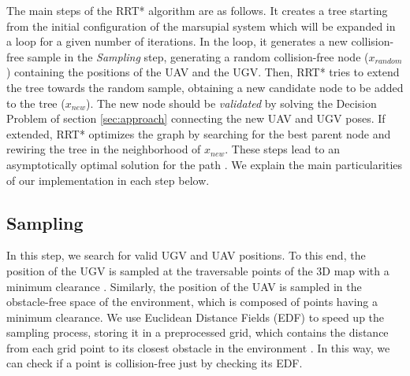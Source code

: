 The main steps of the RRT* algorithm are as follows. %
It creates a tree starting from the initial configuration of the marsupial system which will be expanded in a loop for a given number of iterations. In the loop, it generates a new collision-free sample in the \textit{Sampling} step, generating a random collision-free node ($x_{random}$) containing the positions of the UAV and the UGV. Then, RRT* tries to extend the tree towards the random sample, obtaining a new candidate node to be added to the tree ($x_{new}$). The new node should be \textit{validated} by solving the Decision Problem  of section \ref{sec:approach} connecting the new UAV and UGV poses. If extended, RRT* optimizes the graph by searching for the best parent node and rewiring the tree in the neighborhood of $x_{new}$. These steps lead to an asymptotically optimal solution for the path \cite{karaman_rrt_star}. We explain the main particularities of our implementation in each step below.

\subsection{Sampling}

In this step, we search for valid UGV and UAV positions. To this end, the position of the UGV is sampled at the traversable points of the 3D map with a minimum clearance \cite{driving_pc}. Similarly, the position of the UAV is sampled in the obstacle-free space of the environment, which is composed of points having a minimum clearance. We use Euclidean Distance Fields (EDF) to speed up the sampling process, storing it in a preprocessed grid, which contains the distance from each grid point to its closest obstacle in the environment \cite{edf_survey}. In this way, we can check if a point is collision-free just by checking its EDF.




